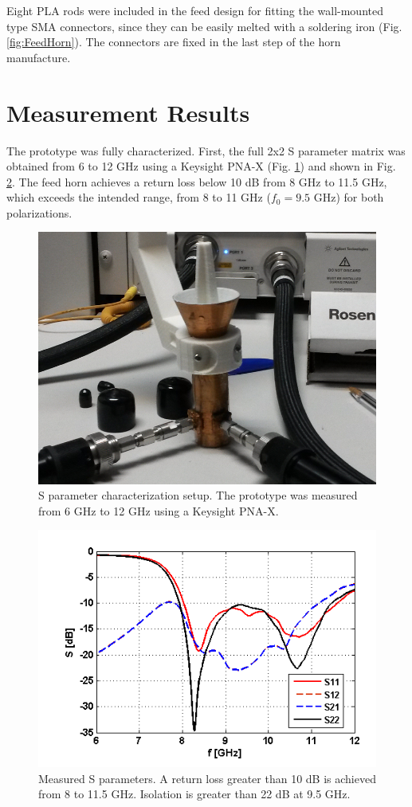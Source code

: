 \documentclass{IEEEtran}
\begin{document}
Eight PLA rods were included in the feed design for fitting the wall-mounted type SMA connectors, since they can be easily melted with a soldering iron (Fig. \ref{fig:FeedHorn}). The connectors are fixed in the last step of the horn manufacture.

\section{Measurement Results}

The prototype was fully characterized. First, the full 2x2 S parameter matrix was obtained from 6 to 12 GHz using a Keysight PNA-X (Fig. \ref{fig:Sxx_Setup}) and shown in Fig. \ref{fig:Sxx}. The feed horn achieves a return loss below 10 dB from 8 GHz to 11.5 GHz, which exceeds the intended range, from 8 to 11 GHz ($f_0=9.5$ GHz) for both polarizations.

\begin{figure}[h]
	\centerline{\includegraphics[width=0.7\columnwidth]{images/Sxx_Meas___.png}}
	\caption{S parameter characterization setup. The prototype was measured from 6 GHz to 12 GHz using a Keysight PNA-X.}
	\label{fig:Sxx_Setup}
\end{figure}

\begin{figure}[h]
	\centerline{\includegraphics[width=0.885\columnwidth]{images/S_6_12_GHz_SMOOTH_TERARAD.png}}
	\caption{Measured S parameters. A return loss greater than 10 dB is achieved from 8 to 11.5 GHz. Isolation is greater than 22 dB at 9.5 GHz.}
	\label{fig:Sxx}
\end{figure}
\end{document}
